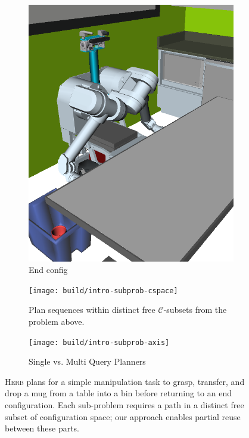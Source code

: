 {\begin{figure}[t]
\begin{widepage}
\begin{center}
\begin{subfigure}[t]{0.19\linewidth}
\includegraphics[width=\columnwidth]{figs/testherb-e.png}
\caption{End config}
\end{subfigure}

\vspace{0.1in}

   \begin{subfigure}[b]{4.0in}
      \begin{center}
      \texttt{[image: build/intro-subprob-cspace]}
      \end{center}
      \caption{Plan sequences
         within distinct free $\mathcal{C}$-subsets
         from the problem above.}
   \end{subfigure}%
   \quad%
   \begin{subfigure}[b]{2.0in}
      \begin{center}
      \texttt{[image: build/intro-subprob-axis]}
      \end{center}
      \caption{Single vs. Multi Query Planners}
   \end{subfigure}
   \caption{\textsc{Herb} plans for a simple manipulation task
      to grasp, transfer, and drop a mug from a table into a bin
      before returning to an end configuration.
      Each sub-problem requires a path in a distinct free subset of
      configuration space;
      our approach enables partial reuse between these parts.}
   \label{fig:intro-multi-part}
\end{center}
\end{widepage}
\end{figure}
}

